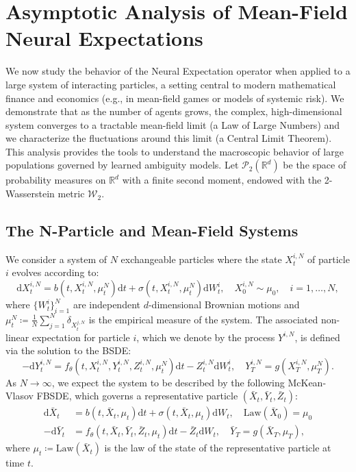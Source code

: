 \documentclass[qian]{imsart}
\newcommand{\R}{\mathbb{R}}
\newcommand{\Pcal}{\mathcal{P}}
\newcommand{\dd}{\mathrm{d}}
\newcommand{\wass}{\mathcal{W}_2}
\newcommand{\Law}{\mathrm{Law}}
\theoremstyle{plain}
\theoremstyle{definition}
\begin{document}
\section{Asymptotic Analysis of Mean-Field Neural Expectations}
\label{sec:asymptotic_analysis}

We now study the behavior of the Neural Expectation operator when applied to a large system of interacting particles, a setting central to modern mathematical finance and economics (e.g., in mean-field games or models of systemic risk). We demonstrate that as the number of agents grows, the complex, high-dimensional system converges to a tractable mean-field limit (a Law of Large Numbers) and we characterize the fluctuations around this limit (a Central Limit Theorem). This analysis provides the tools to understand the macroscopic behavior of large populations governed by learned ambiguity models. Let $\Pcal_2(\R^d)$ be the space of probability measures on $\R^d$ with a finite second moment, endowed with the 2-Wasserstein metric $\wass$.

\subsection{The N-Particle and Mean-Field Systems}
We consider a system of $N$ exchangeable particles where the state $X^{i,N}_t$ of particle $i$ evolves according to:
\begin{equation} \label{eq:n_particle_sde}
\dd X^{i,N}_t = b(t, X^{i,N}_t, \mu^N_t) \dd t + \sigma(t, X^{i,N}_t, \mu^N_t) \dd W^i_t, \quad X^{i,N}_0 \sim \mu_0, \quad i=1,\dots,N,
\end{equation}
where $\{W^i_t\}_{i=1}^N$ are independent $d$-dimensional Brownian motions and $\mu^N_t \coloneqq \frac{1}{N} \sum_{j=1}^N \delta_{X^{j,N}_t}$ is the empirical measure of the system. The associated non-linear expectation for particle $i$, which we denote by the process $Y^{i,N}$, is defined via the solution to the BSDE:
\begin{equation} \label{eq:n_particle_bsde}
- \dd Y^{i,N}_t = f_\theta(t, X^{i,N}_t, Y^{i,N}_t, Z^{i,N}_t, \mu^N_t) \dd t - Z^{i,N}_t \dd W^i_t, \quad Y^{i,N}_T = g(X^{i,N}_T, \mu^N_T).
\end{equation}
As $N \to \infty$, we expect the system to be described by the following McKean-Vlasov FBSDE, which governs a representative particle $(\bar{X}_t, \bar{Y}_t, \bar{Z}_t)$:
\begin{align}
\dd \bar{X}_t &= b(t, \bar{X}_t, \mu_t) \dd t + \sigma(t, \bar{X}_t, \mu_t) \dd W_t, \quad \Law(\bar{X}_0) = \mu_0 \label{eq:mckean_sde} \\
- \dd \bar{Y}_t &= f_\theta(t, \bar{X}_t, \bar{Y}_t, \bar{Z}_t, \mu_t) \dd t - \bar{Z}_t \dd W_t, \quad \bar{Y}_T = g(\bar{X}_T, \mu_T), \label{eq:mckean_bsde}
\end{align}
where $\mu_t \coloneqq \Law(\bar{X}_t)$ is the law of the state of the representative particle at time $t$.
\end{document}
